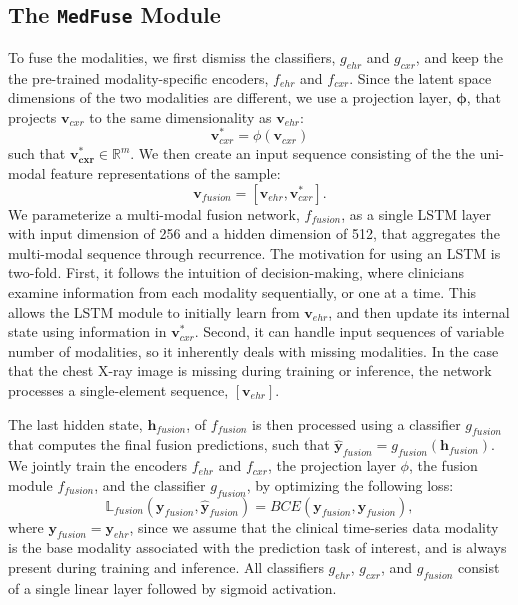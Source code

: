 \documentclass[pmlr]{jmlr}
\begin{document}
\subsection{The \texttt{MedFuse} Module}
\label{fusion}
To fuse the modalities, we first dismiss the classifiers, $g_{ehr}$ and $g_{cxr}$, and keep the the pre-trained modality-specific encoders, $f_{ehr}$ and $f_{cxr}$. Since the latent space dimensions of the two modalities are different, we use a projection layer, $\mathbf{\phi}$, that projects $\mathbf{v}_{cxr}$ to the same dimensionality as $\mathbf{v}_{ehr}$:
\begin{equation}
    \mathbf{v}_{cxr}^* =  { \phi(\mathbf{v}_{cxr})}
    \label{eqn:feats_proj}
\end{equation}
such that $\mathbf{v_{cxr}^*}\in \mathbb{R}^m$. We then create an input sequence consisting of the the uni-modal feature representations of the sample:
\begin{equation}
    \mathbf{v}_{fusion} = [\mathbf{v}_{ehr}, \mathbf{v}_{cxr}^*].
    \label{eqn:feats_concat}
\end{equation}
We parameterize a multi-modal fusion network, $f_{fusion}$, as a single LSTM layer with input dimension of 256 and a hidden dimension of 512, that aggregates the multi-modal sequence through recurrence. The motivation for using an LSTM is two-fold. First, it follows the intuition of decision-making, where clinicians examine information from each modality sequentially, or one at a time. This allows the LSTM module to initially learn from $\mathbf{v}_{ehr}$, and then update its internal state using information in $\mathbf{v}_{cxr}^*$. Second, it can handle input sequences of variable number of modalities, so it inherently deals with missing modalities. In the case that the chest X-ray image is missing during training or inference, the network processes a single-element sequence, $[\mathbf{v}_{ehr}]$. 


The last hidden state, $\textbf{h}_{fusion}$, of $f_{fusion}$ is then processed using a classifier $g_{fusion}$ that computes the final fusion predictions, such that $\mathbf{\hat{y}}_{fusion}=g_{fusion}(\mathbf{h}_{fusion})$. We jointly train the encoders $f_{ehr}$ and $f_{cxr}$, the projection layer $\phi$, the fusion module $f_{fusion}$, and the classifier $g_{fusion}$, by optimizing the following loss:
\begin{equation}
    \mathbb{L}_{fusion}(\mathbf{y}_{fusion}, \mathbf{\hat{y}}_{fusion}) = BCE(\mathbf{y}_{fusion}, \mathbf{\hat{y}}_{fusion}),
    \label{eqn:learning_obj_fusion}
\end{equation}
where $\textbf{y}_{fusion}=\textbf{y}_{ehr}$, since we assume that the clinical time-series data modality is the base modality associated with the prediction task of interest, and is always present during training and inference. All classifiers $g_{ehr}$, $g_{cxr}$, and $g_{fusion}$ consist of a single linear layer followed by sigmoid activation. 
\end{document}
